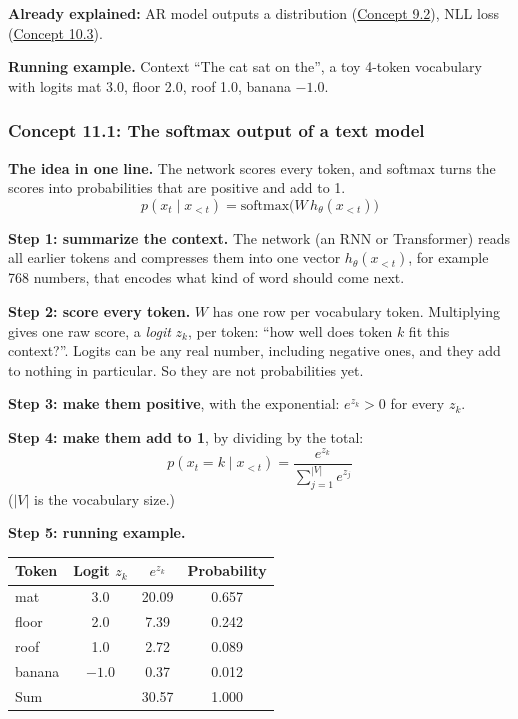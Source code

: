 \documentclass[12pt,a4paper]{article}
\begin{document}
\textbf{Already explained:} AR model outputs a distribution (\hyperref[c9-2]{Concept 9.2}), NLL loss (\hyperref[c10-3]{Concept 10.3}).

\textbf{Running example.} Context ``The cat sat on the'', a toy 4-token vocabulary with logits mat 3.0, floor 2.0, roof 1.0, banana $-1.0$.

\subsubsection{Concept 11.1: The softmax output of a text model}\label{c11-1}

\textbf{The idea in one line.} The network scores every token, and softmax turns the scores into probabilities that are positive and add to 1.
\[
p(x_t\mid x_{<t})=\text{softmax}\big(W\,h_\theta(x_{<t})\big)
\]

\textbf{Step 1: summarize the context.} The network (an RNN or Transformer) reads all earlier tokens and compresses them into one vector $h_\theta(x_{<t})$, for example 768 numbers, that encodes what kind of word should come next.

\textbf{Step 2: score every token.} $W$ has one row per vocabulary token. Multiplying gives one raw score, a \emph{logit} $z_k$, per token: ``how well does token $k$ fit this context?''. Logits can be any real number, including negative ones, and they add to nothing in particular. So they are not probabilities yet.

\textbf{Step 3: make them positive}, with the exponential: $e^{z_k}>0$ for every $z_k$.

\textbf{Step 4: make them add to 1}, by dividing by the total:
\[
p(x_t=k\mid x_{<t})=\frac{e^{z_k}}{\sum_{j=1}^{|V|}e^{z_j}}
\]
($|V|$ is the vocabulary size.)

\textbf{Step 5: running example.}
\begin{center}
\begin{tabular}{@{}lccc@{}}
\toprule
Token & Logit $z_k$ & $e^{z_k}$ & Probability \\
\midrule
mat & 3.0 & 20.09 & 0.657 \\
floor & 2.0 & 7.39 & 0.242 \\
roof & 1.0 & 2.72 & 0.089 \\
banana & $-1.0$ & 0.37 & 0.012 \\
\midrule
Sum & & 30.57 & 1.000 \\
\bottomrule
\end{tabular}
\end{center}
\end{document}
